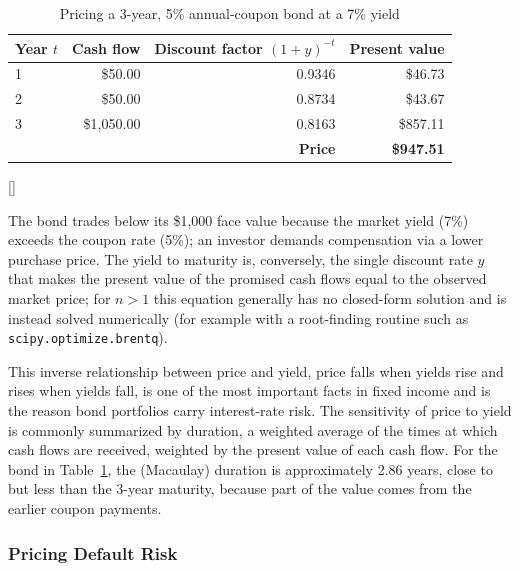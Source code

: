 \documentclass[../ai_in_finance]{subfiles}
\begin{document}
\begin{table}[htbp]
\centering
\begin{lrbox}{\bookmeasuredbox}
\begin{tabular}{lrrr}
\toprule
Year $t$ & Cash flow & Discount factor $(1+y)^{-t}$ & Present value \\
\midrule
1 & \$50.00   & 0.9346 & \$46.73 \\
2 & \$50.00   & 0.8734 & \$43.67 \\
3 & \$1{,}050.00 & 0.8163 & \$857.11 \\
\midrule
\multicolumn{3}{r}{\textbf{Price}} & \textbf{\$947.51} \\
\bottomrule
\end{tabular}
\end{lrbox}
\ifdim\wd\bookmeasuredbox<0.65\linewidth
\setlength{\bookcapwidth}{0.65\linewidth}
\else
\setlength{\bookcapwidth}{\wd\bookmeasuredbox}
\fi
{}[\bookcapwidth]{
\usebox{\bookmeasuredbox}
}{
\caption{Pricing a 3-year, 5\% annual-coupon bond at a 7\% yield}
\label{tab:bond_pricing}
}
\end{table}

The bond trades below its \$1,000 face value because the market yield (7\%) exceeds the coupon rate (5\%); an investor demands compensation via a lower purchase price. The yield to maturity is, conversely, the single discount rate $y$ that makes the present value of the promised cash flows equal to the observed market price; for $n>1$ this equation generally has no closed-form solution and is instead solved numerically (for example with a root-finding routine such as \texttt{scipy.optimize.brentq}).

This inverse relationship between price and yield, price falls when yields rise and rises when yields fall, is one of the most important facts in fixed income and is the reason bond portfolios carry interest-rate risk. The sensitivity of price to yield is commonly summarized by duration, a weighted average of the times at which cash flows are received, weighted by the present value of each cash flow. For the bond in Table~\ref{tab:bond_pricing}, the (Macaulay) duration is approximately 2.86 years, close to but less than the 3-year maturity, because part of the value comes from the earlier coupon payments.

\subsubsection*{Pricing Default Risk}
\end{document}
